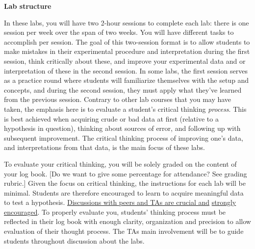 \documentclass[12pt]{report}
\def\anhkhoi#1{{\color{purple}[#1]}}
\begin{document}

\noindent \large \textbf{Lab structure} \normalsize

In these labs, you will have two 2-hour sessions to complete each lab: there is one session per week over the span of two weeks. 
You will have different tasks to accomplish per session. The goal of this two-session format is to allow students to make mistakes in their experimental procedure and interpretation during the first session, think critically about these, and improve your experimental data and or interpretation of these in the second session. 
In some labs, the first session serves as a practice round where students will familiarize themselves with the setup and concepts, and during the second session, they must apply what they've learned from the previous session.
Contrary to other lab courses that you may have taken, the emphasis here is to evaluate a student's critical thinking \textit{process}. This is best achieved when acquiring crude or bad data at first (relative to a hypothesis  in question), thinking about sources of error, and following up with subsequent improvement. 
The critical thinking process of improving one's data, and interpretations from that data, is the main focus of these labs.

To evaluate your critical thinking, you will be solely graded on the content of your log book.
\anhkhoi{Do we want to give some percentage for attendance? See grading rubric.}
Given the focus on critical thinking, the instructions for each lab will be minimal. 
Students are therefore encouraged to learn to acquire meaningful data to test a hypothesis. \underline{Discussions with peers and TAs are crucial and} \underline{strongly encouraged}. 
To properly evaluate you, students' thinking process must  be reflected in their log book with enough clarity, organization and precision to allow  evaluation of their thought process. The TAs main involvement will be to guide students throughout discussion about the labs. 
\end{document}
